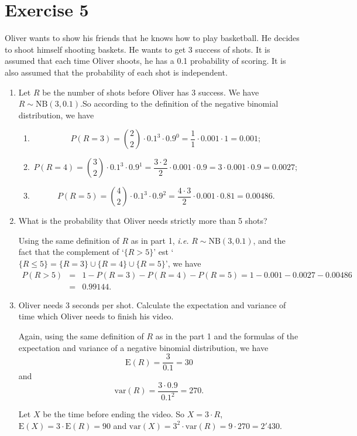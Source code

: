 \documentclass[12pt,thmsa]{article}\usepackage[]{graphicx}\usepackage[]{color}
\begin{document}
\newpage

\section*{Exercise 5}

Oliver wants to show his friends that he knows how to play basketball. He decides to shoot himself shooting baskets. He wants to get 3 success of shots. It is assumed that each time Oliver shoots, he has a 0.1 probability of scoring. It is also assumed that the probability of each shot is independent.

\begin{enumerate}
\item Let $ R $ be the number of shots before Oliver has 3 success.
We have $R \sim \text{NB}(3,0.1)$.So according to the definition of the negative binomial distribution, we have
\begin{enumerate}
\item \begin{equation*}
P(R=3)= \binom{2}{2} \cdot 0.1^3\cdot 0.9^{0} = \frac{1}{1} \cdot 0.001 \cdot 1 = 0.001;
\end{equation*}
\item \begin{equation*}
P(R=4)= \binom{3}{2} \cdot 0.1^3\cdot 0.9^{1} = \frac{3\cdot 2}{2} \cdot 0.001 \cdot 0.9 = 3 \cdot 0.001 \cdot 0.9 = 0.0027;
\end{equation*}
\item \begin{equation*}
P(R=5)= \binom{4}{2} \cdot 0.1^3\cdot 0.9^{2} = \frac{4\cdot 3}{2} \cdot 0.001 \cdot 0.81 = 0.00486.
\end{equation*}
\end{enumerate}

\item What is the probability that Oliver needs strictly more than 5 shots?

Using the same definition of $R$ as in part 1, {\it i.e.}  $R \sim \text{NB}(3,0.1)$, and the fact that the complement of  `$\{R> 5\}$' est `$\{R\leq 5\}=\{R=3\}\cup\{R=4\}\cup\{R=5\}$', we have
\begin{eqnarray*}
P(R> 5)&=& 1 - P(R=3)- P(R=4)- P(R=5) = 1 - 0.001 - 0.0027 -0.00486  \\
&=&  0.99144.
\end{eqnarray*}

\item Oliver needs 3 seconds per shot. Calculate the expectation and variance of time
which Oliver needs to finish his video.

Again, using the same definition of $R$ as in the
part 1 and the formulas of the expectation and variance of a
negative binomial distribution, we have
$$
\text{E}(R) =  \frac{3}{0.1} = 30
$$
and
$$
\text{var}(R) = \frac{3\cdot 0.9}{0.1^2} = 270.
$$

Let $ X $ be the time before ending the video. So $X=3\cdot R$,
$\text{E}(X)=3\cdot \text{E}(R) = 90$ and $\text{var}(X)=3^2 \cdot \text{var}(R) = 9 \cdot 270 = 2'430$.
\end{enumerate}
\end{document}
